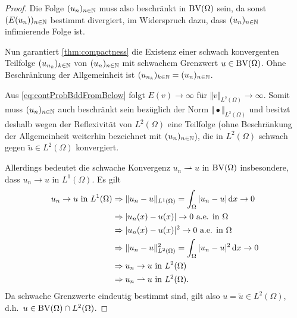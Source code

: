 \begin{proof}
  Die Folge $(u_n)_{n\in\mathbb{N}}$ muss also beschränkt in $\textup{BV}(\Omega)$ sein, da 
  sonst $(E(u_n))_{n\in\mathbb{N}}$ bestimmt divergiert, im Widerspruch dazu, dass
  $(u_n)_{n\in\mathbb{N}}$ infimierende Folge ist.

  \medbreak
  Nun garantiert \cref{thm:compactness} die Existenz einer schwach konvergenten
  Teilfolge $(u_{n_k})_{k\in\mathbb{N}}$ von $(u_n)_{n\in\mathbb{N}}$ mit schwachem Grenzwert
  $u\in\textup{BV}(\Omega)$. Ohne Beschränkung der Allgemeinheit
  ist $(u_{n_k})_{k\in\mathbb{N}}=(u_n)_{n\in\mathbb{N}}$.

  Aus \cref{eq:contProbBddFromBelow} folgt 
  $E(v)\rightarrow\infty$ für
  $\Vert v\Vert_{L^2(\Omega)}\rightarrow\infty$. Somit muss $(u_n)_{n\in\mathbb{N}}$ 
  auch beschränkt sein bezüglich der Norm $\Vert\bullet\Vert_{L^2(\Omega)}$ und
  besitzt deshalb wegen der Reflexivität von $L^2(\Omega)$
  eine Teilfolge (ohne Beschränkung der Allgemeinheit weiterhin bezeichnet mit
  $(u_n)_{n\in\mathbb{N}}$), die
  in $L^2(\Omega)$ schwach gegen $\tilde{u}\in L^2(\Omega)$ konvergiert.

  Allerdings bedeutet die schwache Konvergenz $u_n\rightharpoonup u$ in
  $\textup{BV}(\Omega)$  
  insbesondere, dass $u_n\rightarrow u$ in $L^1(\Omega)$.
  Es gilt 
  \begin{align*}
    u_n \to u \text{ in } L^1(\Omega)&\Rightarrow
    \Vert u_n-u\Vert_{L^1(\Omega)}=\int_\Omega |u_n - u|\,\mathrm{d}x \to 0\\
    &\Rightarrow |u_n(x) - u(x)| \to 0 \text{ a.e. in } \Omega\\
    &\Rightarrow |u_n(x) - u(x)|^2 \to 0 \text{ a.e. in } \Omega\\
    &\Rightarrow \Vert u_n-u\Vert^2_{L^2(\Omega)}=
    \int_\Omega |u_n - u|^2\,\mathrm{d}x \to 0\\
    &\Rightarrow u_n \to u \text{ in } L^2(\Omega)\\
    &\Rightarrow u_n \rightharpoonup u \text{ in } L^2(\Omega).
  \end{align*}
  Da schwache Grenzwerte eindeutig bestimmt sind, gilt also $u=\tilde u
  \in L^2(\Omega)$, d.h.\ $u\in\textup{BV}(\Omega)\cap
  L^2(\Omega)$.


\end{proof}
